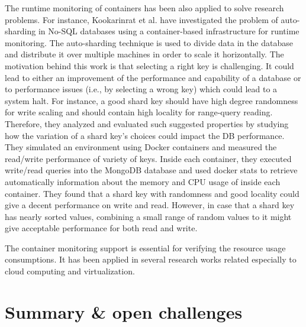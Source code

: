 The runtime monitoring of containers has been also applied to solve research problems. For instance, Kookarinrat et al.\cite{kookarinrat2015analysis} have investigated the problem of auto-sharding in No-SQL databases using a container-based infrastructure for runtime monitoring. 
The auto-sharding technique is used to divide data in the database and distribute it over multiple machines in order to scale it horizontally. The motivation behind this work is that selecting a right key is challenging. It could lead to either an improvement of the performance and capability of a database or to performance issues (i.e., by selecting a wrong key) which could lead to a system halt. 
For instance, a good shard key should have high degree randomness for write scaling and should contain high locality for range-query reading.
Therefore, they analyzed and evaluated such suggested properties by studying how the variation of a shard key’s choices could impact the DB performance.
They simulated an environment using Docker containers and measured the read/write performance of variety of keys. Inside each container, they executed write/read queries into the MongoDB database and used docker stats to retrieve automatically information about the memory and CPU usage of inside each container.
They found that a shard key with randomness and good locality could give a decent performance on write and
read. However, in case that a shard key has nearly sorted values, combining a small range of random values to it might give acceptable performance for both read and write. 
 

The container monitoring support is essential for verifying the resource usage consumptions. It has been applied in several research works related especially to cloud computing and virtualization\cite{peinl2016docker,medel2016modelling}.
\section{Summary \& open challenges}
\label{sec:suumary SOTA}

